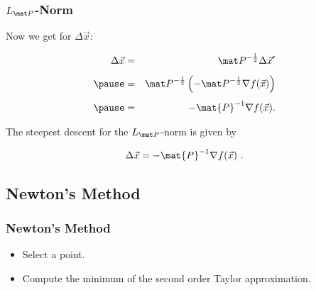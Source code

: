 \begin{frame}
  \frametitle{$L_{\mat P}$-Norm \cont}
 
  Now we get for $\Delta \vec x$:

  \begin{eqnarray*}
    \Delta \vec x 
      &=& {\mat P}^{-\frac{1}{2}} \Delta \vec x' \\[.15cm] \pause
      &=& {\mat P}^{-\frac{1}{2}} \left( - {\mat P}^{-\frac{1}{2}}\nabla f(\vec x) \right) \\[.15cm] \pause
      &=& - \mat{P}^{-1} \nabla f(\vec x).
  \end{eqnarray*}
  \pause
   
   The steepest descent for the $L_{\mat P}$-norm is given by
  
  \begin{displaymath}
     \Delta \vec x = -\mat{P}^{-1} \nabla f(\vec x)~.
  \end{displaymath}
\end{frame}


\subsection{Newton's Method}

\begin{frame}
  \frametitle{Newton's Method}

  
  \begin{itemize}
    \item Select a point.
    \item Compute the minimum of the second order Taylor approximation.
  \end{itemize}
  
  \begin{center}
  \end{center}  
\end{frame}


